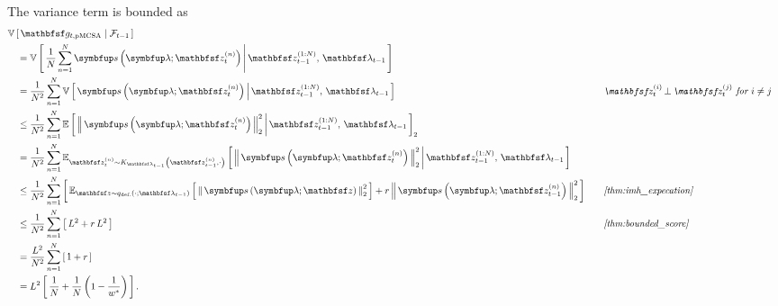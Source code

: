 \begin{proofEnd}
  The variance term is bounded as
  \begin{alignat}{2}
    &\V{ \rvvg_{t,\text{pMCSA}} \mid \mathcal{F}_{t-1}}
    \nonumber
    \\
    &\quad=
    \V{ \frac{1}{N}\sum^{N}_{n=1} \vs\left(\vlambda; \rvvz^{(n)}_t\right) \,\middle|\, \rvvz_{t-1}^{(1:N)},\, \rvvlambda_{t-1} }
    \nonumber
    \\
    &\quad=
    \frac{1}{N^2}\sum^{N}_{n=1} \V{ \vs\left(\vlambda; \rvvz^{(n)}_t\right) \,\middle|\, \rvvz_{t-1}^{(1:N)},\, \rvvlambda_{t-1} }
    &&\quad\text{\textit{\(\rvvz^{(i)}_t \,\bot\, \rvvz^{(j)}_t\) for \(i \neq j\)}}
    \nonumber
    \\
    &\quad\leq
    \frac{1}{N^2}\sum^{N}_{n=1} \E{ \norm{\vs\left(\vlambda; \rvvz^{(n)}_t\right) }^2_2 \,\middle|\, \rvvz_{t-1}^{(1:N)},\, \rvvlambda_{t-1} }_2
    \nonumber
    \\
    &\quad=
    \frac{1}{N^2}\sum^{N}_{n=1} \Esub{\rvvz^{(n)}_t \sim K_{\rvvlambda_{t-1}}\left(\rvvz_{t-1}^{(n)}, \cdot\right)}{ \norm{\vs\left(\vlambda; \rvvz^{(n)}_t\right) }^2_2 \,\middle|\,  \rvvz_{t-1}^{(1:N)},\, \rvvlambda_{t-1} }
    \nonumber
    \\
    &\quad\leq
    \frac{1}{N^2}\sum^{N}_{n=1} \left[\,
      \Esub{\rvvz \sim q_{\text{def.}}\left(\cdot;\rvvlambda_{t-1}\right)}{ \norm{\vs\left(\vlambda; \rvvz \right)}^2_2 }
      +
      {r} \, \norm{\vs\left(\vlambda; \rvvz_{t-1}^{(n)} \right)}^2_2
      \,\right]
    &&\quad\text{\textit{\cref{thm:imh_expecation}}}
    \nonumber
    \\
    &\quad\leq
    \frac{1}{N^2}\sum^{N}_{n=1} \left[\,
        L^2 + {r} \, L^2 \,\right]
    &&\quad\text{\textit{\cref{thm:bounded_score}}}
    \nonumber
    \\
    &\quad=
    \frac{L^2}{N^2} \sum^{N}_{n=1} \left[\,
      1 + {r} \,\right]
    \nonumber
    \\
    &\quad=
    L^2 \left[\, \frac{1}{N} + \frac{1}{N}\,{\left(1 - \frac{1}{w^*}\right)} \,\right].
    \nonumber
  \end{alignat}
\end{proofEnd}

